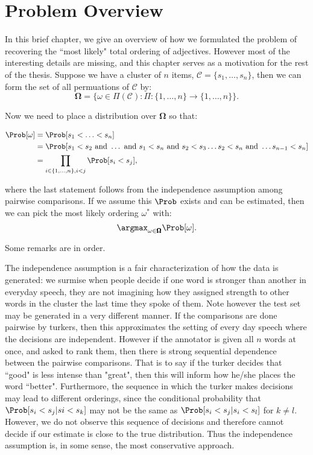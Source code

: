 

\section{Problem Overview}

In this brief chapter, we give an overview of how we formulated the problem of recovering the ``most likely" total ordering of adjectives. However most of the interesting details are missing, and this chapter serves as a motivation for the rest of the thesis. Suppose we have a cluster of $n$ items, $\mathcal C = \{s_1, \ldots, s_n\}$, then we can form the set of all permuations of $\mathcal{C}$ by:
	\[
		\pmb \Omega = \{ \omega \in \Pi(\mathcal{C}) : \Pi : \{1,\ldots,n\} \rightarrow \{1,\ldots,n\}\}.
	\]

Now we need to place a distribution over $\pmb \Omega$ so that:

	\begin{align*}
		\Prob[\omega] &= \Prob[s_1 < \ldots < s_n] \\
				      &= \Prob[ s_1 < s_2 \text{ and } \ldots \text{ and } s_1 < s_n \text{ and } s_2 < s_3 \ldots s_2 < s_n \text{ and } \ldots s_{n-1} < s_n] \\
				      &= \prod_{i \in \{1,\ldots,n\}, i < j} \Prob[ s_i < s_j ],
	\end{align*}

where the last statement follows from the independence assumption among pairwise comparisons. If we assume this $\Prob$ exists and can be estimated, then we can pick the most likely ordering $\omega^*$ with:
	\[
		\argmax_{\omega \in \pmb{\Omega}} \Prob[\omega].
	\]

Some remarks are in order.

\begin{remark}
The independence assumption is a fair characterization of how the data is generated: we surmise when people decide if one word is stronger than another in everyday speech, they are not imagining how they assigned strength to other words in the cluster the last time they spoke of them. Note however the test set may be generated in a very different manner. If the comparisons are done pairwise by turkers, then this approximates the setting of every day speech where the decisions are independent. However if the annotator is given all $n$ words at once, and asked to rank them, then there is strong sequential dependence between the pairwise comparisons. That is to say if the turker decides that ``good" is less intense than "great", then this will inform how he/she places the word ``better". Furthermore, the 
sequence in which the turker makes decisions may lead to different orderings, since the conditional probability that $\Prob[ s_i < s_j | si < s_k ]$ may not be the same as $\Prob [s_i < s_j | s_i < s_l ]$ for $k \neq l$. However, we do not observe this sequence of decisions and therefore cannot decide if our estimate is close to the true distribution. Thus the independence assumption is, in some sense, the most conservative approach.
\end{remark} 


